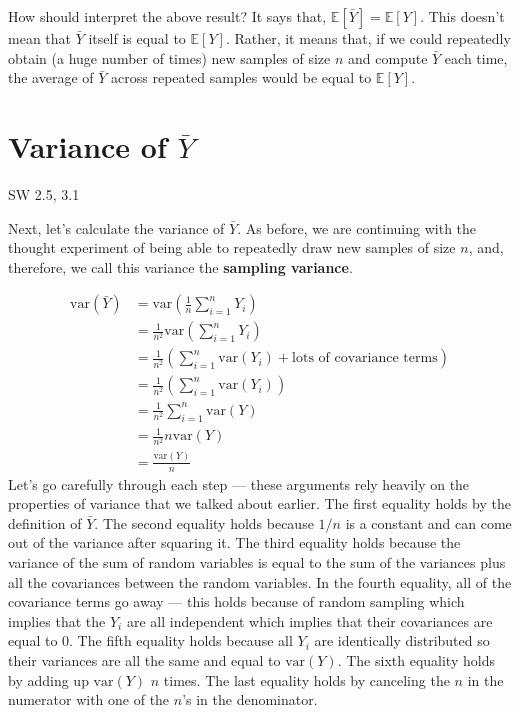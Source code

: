 \documentclass[
  letterpaper,
  DIV=11,
  numbers=noendperiod]{scrreprt}
\begin{document}
How should interpret the above result? It says that,
\(\mathbb{E}[\bar{Y}] = \mathbb{E}[Y]\). This doesn't mean that
\(\bar{Y}\) itself is equal to \(\mathbb{E}[Y]\). Rather, it means that,
if we could repeatedly obtain (a huge number of times) new samples of
size \(n\) and compute \(\bar{Y}\) each time, the average of \(\bar{Y}\)
across repeated samples would be equal to \(\mathbb{E}[Y]\).

\section{\texorpdfstring{Variance of
\(\bar{Y}\)}{Variance of \textbackslash bar\{Y\}}}\label{variance-of-bary}

SW 2.5, 3.1

Next, let's calculate the variance of \(\bar{Y}\). As before, we are
continuing with the thought experiment of being able to repeatedly draw
new samples of size \(n\), and, therefore, we call this variance the
\textbf{sampling variance}.

\[
  \begin{aligned}
    \mathrm{var}(\bar{Y}) &= \mathrm{var}\left(\frac{1}{n} \sum_{i=1}^n Y_i\right) \\
    &= \frac{1}{n^2} \mathrm{var}\left(\sum_{i=1}^n Y_i\right) \\
    &= \frac{1}{n^2} \left( \sum_{i=1}^n \mathrm{var}(Y_i) + \textrm{lots of covariance terms} \right) \\
    &= \frac{1}{n^2} \left( \sum_{i=1}^n \mathrm{var}(Y_i) \right) \\
    &= \frac{1}{n^2} \sum_{i=1}^n \mathrm{var}(Y) \\
    &= \frac{1}{n^2} n \mathrm{var}(Y) \\
    &= \frac{\mathrm{var}(Y)}{n}
  \end{aligned}
\] Let's go carefully through each step --- these arguments rely heavily
on the properties of variance that we talked about earlier. The first
equality holds by the definition of \(\bar{Y}\). The second equality
holds because \(1/n\) is a constant and can come out of the variance
after squaring it. The third equality holds because the variance of the
sum of random variables is equal to the sum of the variances plus all
the covariances between the random variables. In the fourth equality,
all of the covariance terms go away --- this holds because of random
sampling which implies that the \(Y_i\) are all independent which
implies that their covariances are equal to 0. The fifth equality holds
because all \(Y_i\) are identically distributed so their variances are
all the same and equal to \(\mathrm{var}(Y)\). The sixth equality holds
by adding up \(\mathrm{var}(Y)\) \(n\) times. The last equality holds by
canceling the \(n\) in the numerator with one of the \(n\)'s in the
denominator.
\end{document}
